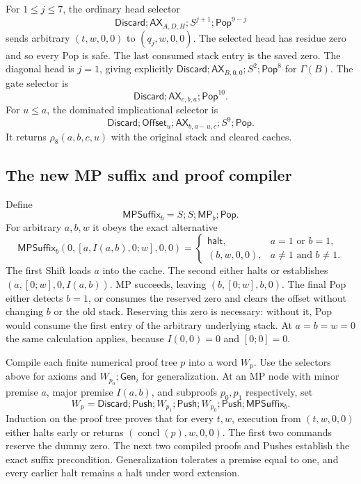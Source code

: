 For $1\le j\le7$, the ordinary head selector
\[
 \mathsf{Discard};\mathsf{AX}_{A,D,H};S^{j+1};\mathsf{Pop}^{9-j}
\]
sends arbitrary $(t,w,0,0)$ to $(q_j,w,0,0)$.  The selected head has
residue zero and so every Pop is safe.  The last consumed stack entry is
the saved zero.  The diagonal head is $j=1$, giving explicitly
$\mathsf{Discard};\mathsf{AX}_{B,0,0};S^2;\mathsf{Pop}^{8}$ for
$\Gamma(B)$.  The gate selector is
\[
 \mathsf{Discard};\mathsf{AX}_{c,b,a};\mathsf{Pop}^{10}.
\]
For $u\le a$, the dominated implicational selector is
\[
 \mathsf{Discard};\mathsf{Offset}_u;
 \mathsf{AX}_{b,a-u,c};S^9;\mathsf{Pop}.
\]
It returns $\rho_8(a,b,c,u)$ with the original stack and cleared caches.

\subsection{The new MP suffix and proof compiler}

Define
\[
 \mathsf{MPSuffix}_b=S;S;\mathsf{MP}_b;\mathsf{Pop}.
\]
For arbitrary $a,b,w$ it obeys the exact alternative
\[
 \mathsf{MPSuffix}_b(0,[a,I(a,b),0;w],0,0)=
 \begin{cases}
 \mathsf{halt},&a=1\text{ or }b=1,\\
 (b,w,0,0),&a\ne1\text{ and }b\ne1.
 \end{cases}
\]
The first Shift loads $a$ into the cache.  The second either halts or
establishes $(a,[0;w],0,I(a,b))$.  MP succeeds, leaving
$(b,[0;w],b,0)$.  The final Pop either detects $b=1$, or consumes the
reserved zero and clears the offset without changing $b$ or the old
stack.  Reserving this zero is necessary: without it, Pop would consume
the first entry of the arbitrary underlying stack.  At $a=b=w=0$ the
same calculation applies, because $I(0,0)=0$ and $[0;0]=0$.

Compile each finite numerical proof tree $p$ into a word $W_p$.  Use the
selectors above for axioms and $W_{p_0};\mathsf{Gen}_i$ for generalization.
At an MP node with minor premise $a$, major premise $I(a,b)$, and
subproofs $p_0,p_1$ respectively, set
\[
 W_p=\mathsf{Discard};\mathsf{Push};
       W_{p_1};\mathsf{Push};W_{p_0};\mathsf{Push};\mathsf{MPSuffix}_b.
\]
Induction on the proof tree proves that for every $t,w$, execution from
$(t,w,0,0)$ either halts early or returns
$(\operatorname{concl}(p),w,0,0)$.  The first two commands reserve the
dummy zero.  The next two compiled proofs and Pushes establish the exact
suffix precondition.  Generalization tolerates a premise equal to one,
and every earlier halt remains a halt under word extension.

